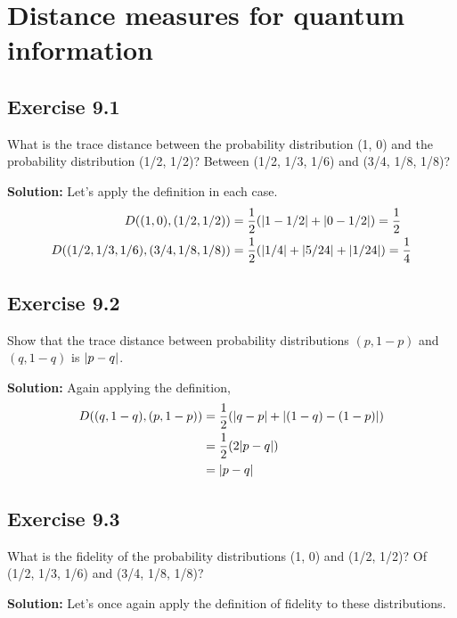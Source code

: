 \documentclass{book}
\begin{document}
\chapter*{Distance measures for quantum information}

\section*{Exercise 9.1}
    What is the trace distance between the probability distribution (1, 0) and the probability distribution (1/2, 1/2)? Between (1/2, 1/3, 1/6) and (3/4, 1/8, 1/8)?
    
    \textbf{Solution:} Let's apply the definition in each case.
    \begin{align}
    \begin{aligned}
        D((1,0), (1/2,1/2)) &= \frac{1}{2} (\abs{1-1/2}+\abs{0-1/2}) = \frac{1}{2}\\
        D((1/2,1/3,1/6), (3/4,1/8,1/8)) &= \frac{1}{2} (\abs{1/4} + \abs{5/24}+\abs{1/24}) = \frac{1}{4}
    \end{aligned}
    \end{align}
    
\section*{Exercise 9.2}
    Show that the trace distance between probability distributions $(p, 1 - p)$ and $(q, 1 - q)$ is $\abs{p - q}$.
    
    \textbf{Solution:} Again applying the definition,
    \begin{align}
    \begin{aligned}
        D((q,1-q), (p,1-p)) &= \frac{1}{2}(\abs{q-p} + \abs{(1-q)-(1-p)}) \\
        &= \frac{1}{2} (2 \abs{p-q}) \\
        &= \abs{p-q}
    \end{aligned}
    \end{align}

\section*{Exercise 9.3}
    What is the fidelity of the probability distributions (1, 0) and (1/2, 1/2)? Of (1/2, 1/3, 1/6) and (3/4, 1/8, 1/8)?
    
    \textbf{Solution:} Let's once again apply the definition of fidelity to these distributions.
    
\end{document}
